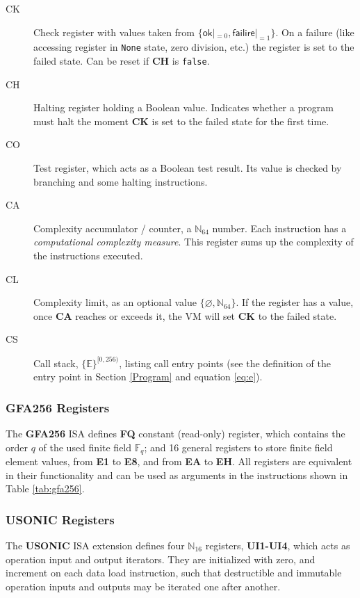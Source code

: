 \documentclass[9pt,oneside]{amsart}
\begin{document}
\begin{multicols}{2}
\begin{description}
\item[CK] Check register with values taken from $\{\mathsf{ok}|_{=0}, \mathsf{failire}|_{=1}\}$.
    On a failure (like accessing register in \texttt{None} state, zero division, etc.)
    the register is set to the failed state.
    Can be reset if \textbf{CH} is \texttt{false}.
\item[CH] Halting register holding a Boolean value.
    Indicates whether a program must halt the moment \textbf{CK}
    is set to the failed state for the first time.
\item[CO] Test register, which acts as a Boolean test result.
    Its value is checked by branching and some halting instructions.
\item[CA] Complexity accumulator / counter, a $\mathbb{N}_{64}$ number.
    Each instruction has a \emph{computational complexity measure}.
    This register sums up the complexity of the instructions executed.
\item[CL] Complexity limit, as an optional value $\{\varnothing, \mathbb{N}_{64}\}$.
    If the register has a value, once \textbf{CA} reaches or exceeds it,
    the VM will set \textbf{CK} to the failed state.
\item[CS] Call stack, $\{ \mathbb{E} \}^{[0, 256)}$, listing call entry points
    (see the definition of the entry point in Section \ref{Program} and equation \ref{eq:e}).
\end{description}

\subsubsection{\textbf{GFA256} Registers}

The \textbf{GFA256} ISA defines \textbf{FQ} constant (read-only) register,
which contains the order $q$ of the used finite field $\mathbb{F}_q$; and
16 general registers to store finite field element values,
from \textbf{E1} to \textbf{E8}, and from \textbf{EA} to \textbf{EH}.
All registers are equivalent in their functionality and can be used
as arguments in the instructions shown in Table \ref{tab:gfa256}.

\subsubsection{\textbf{USONIC} Registers}

The \textbf{USONIC} ISA extension defines four $\mathbb{N}_{16}$ registers,
\textbf{UI1-UI4}, which acts as operation input and output iterators.
They are initialized with zero, and increment on each data load instruction,
such that destructible and immutable operation inputs and outputs may be
iterated one after another.


\end{multicols}
\end{document}
